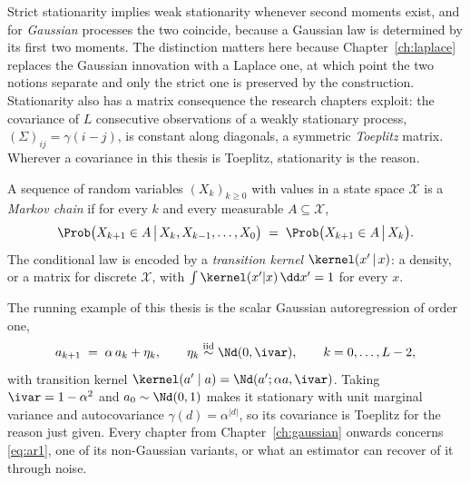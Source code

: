 Strict stationarity implies weak stationarity whenever second moments exist,
and for \emph{Gaussian} processes the two coincide, because a Gaussian law is
determined by its first two moments. The distinction matters here because
Chapter~\ref{ch:laplace} replaces the Gaussian innovation with a Laplace one,
at which point the two notions separate and only the strict one is preserved by
the construction. Stationarity also has a matrix consequence the research
chapters exploit: the covariance of $L$ consecutive observations of a weakly
stationary process, $(\Sigma)_{ij} = \gamma(i - j)$, is constant along
diagonals, a symmetric \emph{Toeplitz} matrix. Wherever a covariance in this
thesis is Toeplitz, stationarity is the reason.

\begin{definition}
A sequence of random variables $(X_k)_{k \geq 0}$ with values in a state space
$\mathcal{X}$ is a \emph{Markov chain} if for every $k$ and every measurable
$A \subseteq \mathcal{X}$,
\begin{equation}
  \Prob\big(X_{k+1} \in A \,\big|\, X_k, X_{k-1}, \dots, X_0\big)
  \;=\; \Prob\big(X_{k+1} \in A \,\big|\, X_k\big) .
  \label{eq:markov-property}
\end{equation}
The conditional law is encoded by a \emph{transition kernel}
$\kernel(x' \,|\, x)$: a density, or a matrix for discrete $\mathcal{X}$, with
$\int \kernel(x'|x)\,\dd x' = 1$ for every $x$.
\end{definition}

\begin{example}\label{ex:ar1}
The running example of this thesis is the scalar Gaussian autoregression of
order one,
\begin{equation}
  a_{k+1} \;=\; \alpha\, a_k + \eta_k ,
  \qquad
  \eta_k \stackrel{\text{iid}}{\sim} \Nd(0, \ivar),
  \qquad k = 0, \dots, L-2 ,
  \label{eq:ar1}
\end{equation}
with transition kernel $\kernel(a' \mid a) = \Nd(a'; \alpha a, \ivar)$. Taking
$\ivar = 1 - \alpha^2$ and $a_0 \sim \Nd(0,1)$ makes it stationary with unit
marginal variance and autocovariance $\gamma(d) = \alpha^{|d|}$, so its
covariance is Toeplitz for the reason just given. Every chapter from
Chapter~\ref{ch:gaussian} onwards concerns \eqref{eq:ar1}, one of its
non-Gaussian variants, or what an estimator can recover of it through noise.
\end{example}

